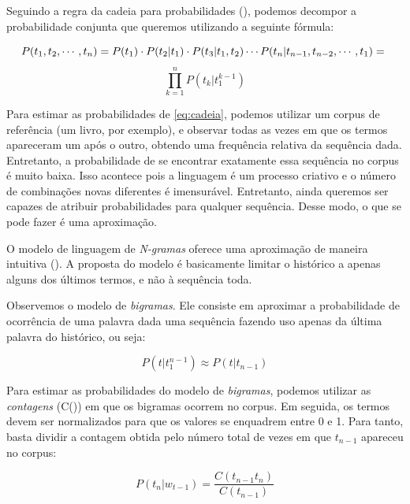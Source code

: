 Seguindo a regra da cadeia para probabilidades (\cite{Jurafsky:2009:SLP:1214993}), podemos decompor a probabilidade conjunta que queremos utilizando a seguinte fórmula:

\begin{equation}
\label{eq:cadeia}
	P(t_1, t_2, \cdots, t_n) = P(t_1)\cdot P(t_2|t_1)\cdot P(t_3|t_1, t_2) \cdots P(t_n|t_{n-1},t_{n-2}, \cdots, t_1) =\notag\\ 
\end{equation}
\begin{equation}
	\prod_{k=1}^{n} P(t_{k}|t_{1}^{k-1})
\end{equation}

Para estimar as probabilidades de \ref{eq:cadeia}, podemos utilizar um corpus de referência (um livro, por exemplo), e observar todas as vezes em que os termos apareceram um após o outro, obtendo uma frequência relativa da sequência dada. Entretanto, a probabilidade de se encontrar exatamente essa sequência no corpus é muito baixa. Isso acontece pois a linguagem é um processo criativo e o número de combinações novas diferentes é imensurável. Entretanto, ainda queremos ser capazes de atribuir probabilidades para qualquer sequência. Desse modo, o que se pode fazer é uma aproximação.

O modelo de linguagem de \textit{N-gramas} oferece uma aproximação de maneira intuitiva (\cite{Jurafsky:2009:SLP:1214993}). A proposta do modelo é basicamente limitar o histórico a apenas alguns dos últimos termos, e não à sequência toda. 

Observemos o modelo de \textit{bigramas}. Ele consiste em aproximar a probabilidade de ocorrência de uma palavra dada uma sequência
fazendo uso apenas da última palavra do histórico, ou seja:

\begin{equation}
\label{eq:bigramsp}
    P(t|t_{1}^{n-1}) \approx P(t|t_{n-1})
\end{equation}

Para estimar as probabilidades do modelo de \textit{bigramas}, podemos utilizar as \textit{contagens} (C()) em que os bigramas ocorrem no corpus. Em seguida, os termos devem ser normalizados para que os valores se enquadrem entre 0 e 1. Para tanto, basta dividir a contagem obtida pelo número total de vezes em que $t_{n-1}$ apareceu no corpus:

\begin{equation}
\label{eq:brigrams}
    P(t_n|w_{t-1}) = \frac{C(t_{n-1}t_n)}{C(t_{n-1})}
\end{equation}

